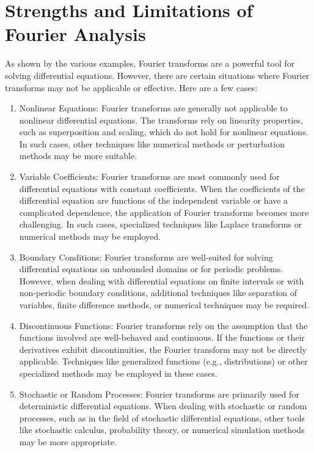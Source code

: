 \section{Strengths and Limitations of Fourier Analysis}
As shown by the various examples, Fourier transforms are a powerful tool for solving differential equations. However, there are certain situations where Fourier transforms may not be applicable or effective. Here are a few cases:

\begin{enumerate}
    \item Nonlinear Equations: Fourier transforms are generally not applicable to nonlinear differential equations. The transforms rely on linearity properties, such as superposition and scaling, which do not hold for nonlinear equations. In such cases, other techniques like numerical methods or perturbation methods may be more suitable.
    \item Variable Coefficients: Fourier transforms are most commonly used for differential equations with constant coefficients. When the coefficients of the differential equation are functions of the independent variable or have a complicated dependence, the application of Fourier transforms becomes more challenging. In such cases, specialized techniques like Laplace transforms or numerical methods may be employed.
    \item Boundary Conditions: Fourier transforms are well-suited for solving differential equations on unbounded domains or for periodic problems. However, when dealing with differential equations on finite intervals or with non-periodic boundary conditions, additional techniques like separation of variables, finite difference methods, or numerical techniques may be required.
    \item Discontinuous Functions: Fourier transforms rely on the assumption that the functions involved are well-behaved and continuous. If the functions or their derivatives exhibit discontinuities, the Fourier transform may not be directly applicable. Techniques like generalized functions (e.g., distributions) or other specialized methods may be employed in these cases.
    \item Stochastic or Random Processes: Fourier transforms are primarily used for deterministic differential equations. When dealing with stochastic or random processes, such as in the field of stochastic differential equations, other tools like stochastic calculus, probability theory, or numerical simulation methods may be more appropriate.
\end{enumerate}